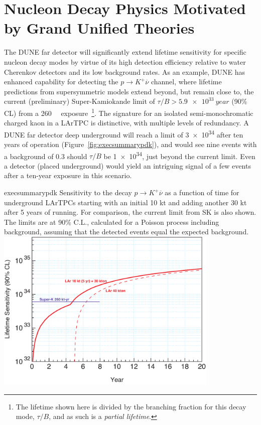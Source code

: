 \section{Nucleon Decay Physics Motivated by Grand Unified Theories}


The DUNE far detector will significantly extend lifetime sensitivity for specific nucleon decay
modes by virtue of its high detection efficiency relative to water Cherenkov detectors and its 
low background rates.  As an example, DUNE has
enhanced capability for detecting the $p\to K^+\overline{\nu}$
channel, where lifetime predictions from supersymmetric models extend
beyond, but remain close to, the current (preliminary)
Super-Kamiokande limit of  $\tau/B > \SI{5.9e33}{year}$ (90\% CL)
from a \SI[number-unit-product = -, inter-unit-product=\ensuremath{{}\cdot{}}]{260}{\kt\year}
exposure~\cite{kearns_isoups}\footnote{The lifetime shown here is divided by the branching
fraction for this decay mode, $\tau/B$, and as such is a \emph{partial lifetime}.}.  
The signature for an
isolated semi-monochromatic charged kaon in a LArTPC is distinctive,
with multiple levels of redundancy.  A  DUNE far detector deep
underground will reach a limit of \SI{3e34}{\year} after ten years
of operation (Figure~\ref{fig:execsummarypdk}), and would see nine
events with a background of 0.3 should $\tau/B$ be \SI{1e34}{\year}, just beyond the
current limit.
Even a  detector 
(placed underground) 
would yield an intriguing signal of a few events after a ten-year exposure 
in this scenario.

\begin{cdrfigure}{execsummarypdk} {Sensitivity to the
    decay $p\to K^+ \overline{\nu}$ as a function of time for
    underground  LArTPCs starting with an initial 10 kt and adding another 30 kt
after 5 years of running.
  For comparison, the current limit from SK is also shown.
  The limits are at 90\% C.L., calculated for
  a Poisson process including background, assuming that the detected events
  equal the expected background.}
\includegraphics[width=0.8\textwidth]{volume-physics/figures/lar10-40.pdf}
\end{cdrfigure}

